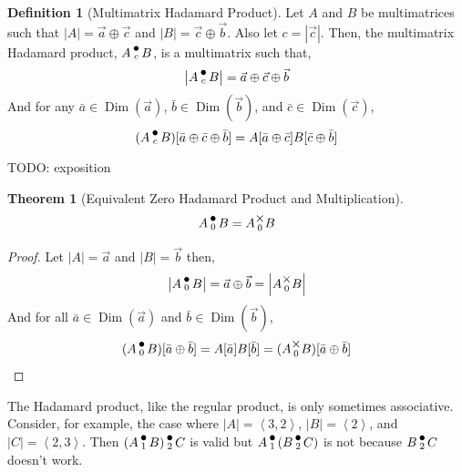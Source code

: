 \documentclass[12pt]{book}
\theoremstyle{plain}
\newtheorem{theorem}{Theorem}[chapter]
\theoremstyle{definition}
\newtheorem{definition}{Definition}[chapter]
\theoremstyle{ppart}
\theoremstyle{case}
\theoremstyle{solution}
\DeclareMathOperator{\Dim}{Dim}
\newcommand{\mmult}[1]{\text{\raisebox{1ex}{$\underset{#1}{\times}$}}}
\newcommand{\dmult}[1]{\text{\raisebox{1ex}{$\underset{#1}{\,\bullet\,}$}}}
\newcommand{\shape}[1]{\left|#1\right|}
\begin{document}
\begin{definition}[Multimatrix Hadamard Product]
\label{multi_had_prod}
Let $A$ and $B$ be multimatrices such that $\shape{A} = \vec{a} \oplus \vec{c}$
and $\shape{B} = \vec{c} \oplus \vec{b}$. Also let $c = \shape{\vec{c}}$.
Then, the multimatrix Hadamard product, $A \dmult{c} B$, is a multimatrix
such that,
\[ \shape{A \dmult{c} B} = \vec{a} \oplus \vec{c} \oplus \vec{b} \]
And for any $\bar{a} \in \Dim(\vec{a})$, $\bar{b} \in \Dim(\vec{b})$,
and $\bar{c} \in \Dim(\vec{c})$,
\[
  (A \dmult{c} B)[\bar{a} \oplus \bar{c} \oplus \bar{b}]
  = A[\bar{a} \oplus \bar{c}] B[\bar{c} \oplus \bar{b}]
\]
\end{definition}

TODO: exposition

\begin{theorem}[Equivalent Zero Hadamard Product and Multiplication]
\[ A \dmult{0} B = A \mmult{0} B \]
\end{theorem}
\begin{proof}
Let $\shape{A} = \vec{a}$ and $\shape{B} = \vec{b}$ then,
\[ \shape{A \dmult{0} B} = \vec{a} \oplus \vec{b} = \shape{A \mmult{0} B} \]
And for all $\bar{a} \in \Dim(\vec{a})$ and $\bar{b} \in \Dim(\vec{b})$,
\[ (A \dmult{0} B)[\bar{a} \oplus \bar{b}] = A[\bar{a}] B[\bar{b}] = (A \mmult{0} B)[\bar{a} \oplus \bar{b}] \]
\end{proof}

The Hadamard product, like the regular product, is only sometimes associative. Consider, for example,
the case where $\shape{A} = \left< 3, 2 \right>$, $\shape{B} = \left< 2 \right>$, and $\shape{C} = \left<2, 3\right>$.
Then $(A \dmult{1} B) \dmult{2} C$ is valid but $A \dmult{1} (B \dmult{2} C)$ is not because
$B \dmult{2} C$ doesn't work.
\end{document}
